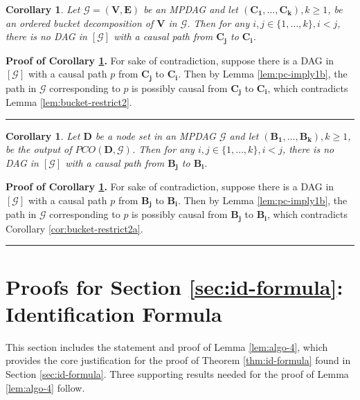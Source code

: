 \documentclass[11pt]{article}
\newcommand{\BlackBox}{\rule{1.5ex}{1.5ex}}  %
\newtheorem{corollary}[theorem]{Corollary}
\newcommand{\mb}[1]{\mathbf{#1}}
\newcommand{\g}[1][G]{\mathcal{#1}}
\newenvironment{proofof}[1][]{\noindent \textbf{Proof of #1.}}{\hfill\BlackBox}
\begin{document}
\begin{corollary} 
\label{cor:bucket-restrict2b}
    Let $\g=(\mb{V},\mb{E})$ be an MPDAG and let $(\mb{C_1}, \dots, \mb{C_k}), k \ge 1$, be an ordered bucket decomposition of $\mb{V}$ in $\g$. Then for any $i, j \in \{1, \dots, k\}, i < j$, there is no DAG in $[\g]$ with a causal path from $\mb{C_j}$ to $\mb{C_i}$.
\end{corollary}

\begin{proofof}[Corollary \ref{cor:bucket-restrict2b}]
    For sake of contradiction, suppose there is a DAG in $[\g]$ with a causal path $p$ from $\mb{C_j}$ to $\mb{C_i}$. Then by Lemma \ref{lem:pc-imply1b}, the path in $\g$ corresponding to $p$ is possibly causal from $\mb{C_j}$ to $\mb{C_i}$, which contradicts Lemma \ref{lem:bucket-restrict2}.
\end{proofof}


\begin{corollary} 
\label{cor:bucket-restrict2c}
    Let $\mb{D}$ be a node set in an MPDAG $\g$ and let $(\mb{B_1}, \dots, \mb{B_k}), k \ge 1$, be the output of $PCO(\mb{D}, \g)$. Then for any $i, j \in \{1, \dots, k\}, i < j$, there is no DAG in $[\g]$ with a causal path from $\mb{B_j}$ to $\mb{B_i}$.
\end{corollary}

\begin{proofof}[Corollary \ref{cor:bucket-restrict2c}]
    For sake of contradiction, suppose there is a DAG in $[\g]$ with a causal path $p$ from $\mb{B_j}$ to $\mb{B_i}$. Then by Lemma \ref{lem:pc-imply1b}, the path in $\g$ corresponding to $p$ is possibly causal from $\mb{B_j}$ to $\mb{B_i}$, which contradicts Corollary \ref{cor:bucket-restrict2a}.
\end{proofof}











\section{Proofs for Section \ref{sec:id-formula}: Identification Formula}
\label{app:id-formula}

This section includes the statement and proof of Lemma \ref{lem:algo-4}, which provides the core justification for the proof of Theorem \ref{thm:id-formula} found in Section \ref{sec:id-formula}. Three supporting results needed for the proof of Lemma \ref{lem:algo-4} follow.
\end{document}
